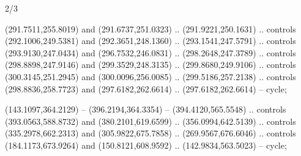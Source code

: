 \begin{flagdescription}{2/3}
\begin{scope}[shift={(0.5\flaglength,0.5)},scale=\flagwidth/545]
\begin{scope}[y=0.80pt, x=0.80pt, yscale=-1,shift={(-297,-430)}]
  (291.7511,255.8019) and (291.6737,251.0323) .. (291.9221,250.1631) .. controls
  (292.1006,249.5381) and (292.3651,248.1360) .. (293.1541,247.5791) .. controls
  (293.9130,247.0434) and (296.7532,246.0831) .. (298.2648,247.3789) .. controls
  (298.8898,247.9146) and (299.3529,248.3135) .. (299.8680,249.9106) .. controls
  (300.3145,251.2945) and (300.0096,256.0085) .. (299.5186,257.2138) .. controls
  (298.8836,258.7723) and (297.6182,262.6614) .. (297.6182,262.6614) -- cycle;
\begin{scope}[shift={(28.51887,-25.61095)}]
\draw %
  [black,line join=miter,line width=1\lw]
  (143.1097,364.2129) --
  (396.2194,364.3354) -- (394.4120,565.5548) .. controls (393.0563,588.8732) and
  (380.2101,619.6599) .. (356.0994,642.5139) .. controls (335.2978,662.2313) and
  (305.9822,675.7858) .. (269.9567,676.6046) .. controls (184.1173,673.9264) and
  (150.8121,608.9592) .. (142.9834,563.5023) -- cycle;
\end{scope}
\end{scope}
\end{scope}
\fi
\framecode{}
\end{flagdescription}
